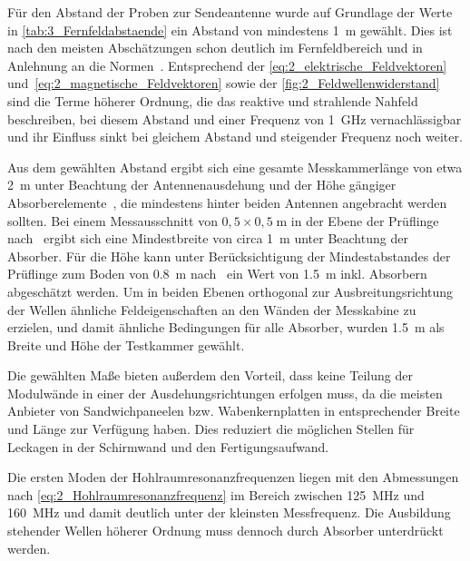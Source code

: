 Für den Abstand der Proben zur Sendeantenne wurde auf Grundlage der Werte in \Tabelle\ref{tab:3_Fernfeldabstaende} ein Abstand von mindestens \SI{1}{\meter} gewählt. Dies ist nach den meisten Abschätzungen schon deutlich im Fernfeldbereich und in Anlehnung an die Normen~\cite{DIN_EN_61000-4-3, VG_95373_15}. Entsprechend der \Gleichungen\eqref{eq:2_elektrische_Feldvektoren} und~\eqref{eq:2_magnetische_Feldvektoren} sowie der \Abb\ref{fig:2_Feldwellenwiderstand} sind die Terme höherer Ordnung, die das reaktive und strahlende Nahfeld beschreiben, bei diesem Abstand und einer Frequenz von \SI{1}{\giga\hertz} vernachlässigbar und ihr Einfluss sinkt bei gleichem Abstand und steigender Frequenz noch weiter. 
\par
\vspace{\linespace}
Aus dem gewählten Abstand ergibt sich eine gesamte Messkammerlänge von etwa \SI{2}{\meter} unter Beachtung der Antennenausdehung und der Höhe gängiger Absorberelemente~\cite{Telemeter_Produktseite, EMV-Support_Produktseite}, die mindestens hinter beiden Antennen angebracht werden sollten. Bei einem Messausschnitt von $0,5 \times 0,5\;\si{\meter}$ in der Ebene der Prüflinge nach~\cite{DIN_EN_61000-4-3} ergibt sich eine Mindestbreite von circa \SI{1}{\meter} unter Beachtung der Absorber. Für die Höhe kann unter Berücksichtigung der Mindestabstandes der Prüflinge zum Boden von \SI{0,8}{\meter} nach~\cite{DIN_EN_61000-4-3, DIN_EN_61000-5-7} ein Wert von \SI{1,5}{\meter} inkl. Absorbern abgeschätzt werden. Um in beiden Ebenen orthogonal zur Ausbreitungsrichtung der Wellen ähnliche Feldeigenschaften an den Wänden der Messkabine zu erzielen, und damit ähnliche Bedingungen für alle Absorber, wurden \SI{1,5}{\meter} als Breite und Höhe der Testkammer gewählt. 
\par
\vspace{\linespace}
Die gewählten Maße bieten außerdem den Vorteil, dass keine Teilung der Modulwände in einer der Ausdehungsrichtungen erfolgen muss, da die meisten Anbieter von Sandwichpaneelen bzw. Wabenkernplatten in entsprechender Breite und Länge zur Verfügung haben. Dies reduziert die möglichen Stellen für Leckagen in der Schirmwand und den Fertigungsaufwand.
\par
\vspace{\linespace}
Die ersten Moden der Hohlraumresonanzfrequenzen liegen mit den Abmessungen nach \Gleichung\eqref{eq:2_Hohlraumresonanzfrequenz} im Bereich zwischen \SI{125}{\mega\hertz} und \SI{160}{\mega\hertz} und damit deutlich unter der kleinsten Messfrequenz. Die Ausbildung stehender Wellen höherer Ordnung muss dennoch durch Absorber unterdrückt werden.
